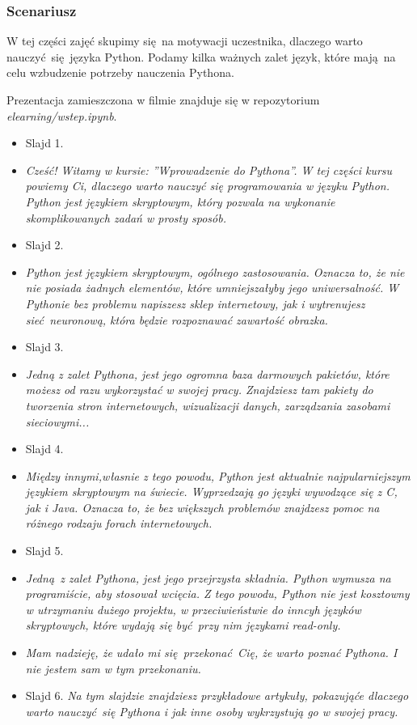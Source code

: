 \documentclass{mwart}
\begin{document}
\subsubsection{Scenariusz}
W tej części zajęć skupimy się na motywacji uczestnika, dlaczego warto
nauczyć się języka Python. Podamy kilka ważnych zalet język, które mają na celu
wzbudzenie potrzeby nauczenia Pythona.

Prezentacja zamieszczona w filmie znajduje się w repozytorium
\emph{elearning/wstep.ipynb}.

\begin{itemize}
  \item Slajd 1.
  \item \emph{Cześć! Witamy w kursie: ''Wprowadzenie do Pythona''. W tej części kursu
      powiemy Ci, dlaczego warto nauczyć się programowania w
      języku Python. Python jest językiem skryptowym, który pozwala na wykonanie
      skomplikowanych zadań w prosty sposób.}
  \item Slajd 2.
  \item \emph{Python jest językiem skryptowym, ogólnego zastosowania. Oznacza to, że nie
      nie posiada żadnych elementów, które umniejszałyby jego uniwersalność. W Pythonie
      bez problemu napiszesz sklep internetowy, jak i wytrenujesz sieć neuronową, która
      będzie rozpoznawać zawartość obrazka.}
  \item Slajd 3.
  \item \emph{Jedną z zalet Pythona, jest jego ogromna baza darmowych pakietów, które
      możesz od razu wykorzystać w swojej pracy. Znajdziesz tam pakiety do tworzenia
      stron internetowych, wizualizacji danych, zarządzania zasobami sieciowymi...}
  \item Slajd 4.
  \item \emph{Między innymi,własnie z tego powodu, Python jest aktualnie najpularniejszym
      językiem skryptowym na świecie. Wyprzedzają go języki wywodzące się z C, jak i
      Java. Oznacza to, że bez większych problemów znajdzesz pomoc na różnego rodzaju
      forach internetowych.}
  \item Slajd 5.
  \item \emph{Jedną z zalet Pythona, jest jego przejrzysta składnia. Python wymusza na
      programiście, aby stosował wcięcia. Z tego powodu, Python nie jest kosztowny w
      utrzymaniu dużego projektu, w przeciwieństwie do inncyh języków skryptowych, które wydają się być przy
      nim językami read-only.}
  \item \emph{Mam nadzieję, że udało mi się przekonać Cię, że warto poznać Pythona. I
      nie jestem sam w tym przekonaniu.}
  \item Slajd 6.
    \emph{Na tym slajdzie znajdziesz przykładowe artykuły, pokazująće dlaczego warto nauczyć się
      Pythona i jak inne osoby wykrzystują go w swojej pracy.}
\end{itemize}
\end{document}
